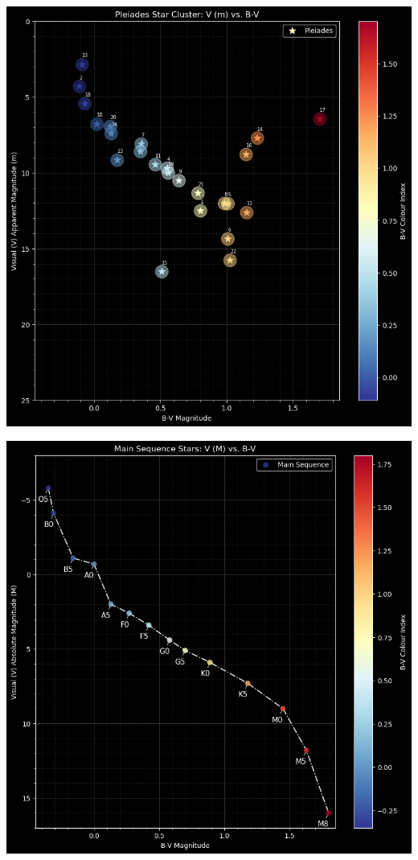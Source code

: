 \documentclass[12pt]{article}
\begin{document}
\begin{minipage}{.49\textwidth}
    \captionsetup{hypcap=false}
    \centering
    \includegraphics[width=\linewidth]{pleiades graoh.png}
    \label{fig:pleigraph}
\end{minipage}
\hfill
\begin{minipage}{.5\textwidth}
    \captionsetup{hypcap=false}
    \centering
    \includegraphics[width=\linewidth]{ms graph.png}
    \label{fig:msgraph}
\end{minipage}
\vspace{0.25cm}
\end{document}
